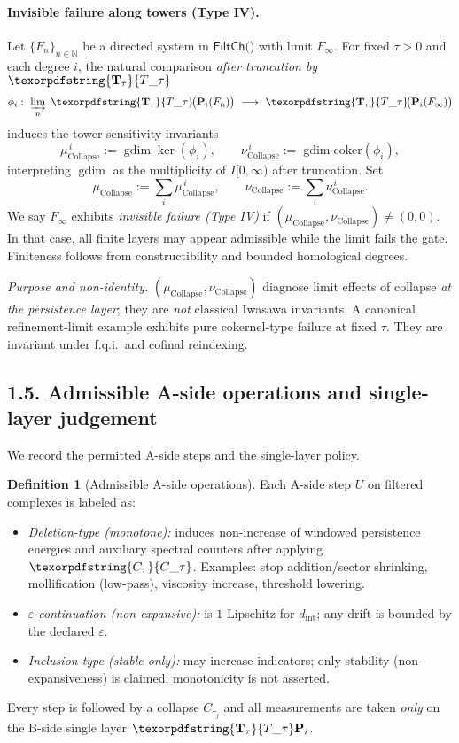 \documentclass[11pt]{article}
\numberwithin{equation}{section}
\theoremstyle{plain}
\theoremstyle{definition}
\theoremstyle{remark}
\DeclareMathOperator{\gdim}{gdim}
\theoremstyle{plain}
\theoremstyle{definition}
\numberwithin{equation}{section}
\theoremstyle{definition}
\newtheorem{definition}[theorem]{Definition}
\DeclareRobustCommand{\FiltCh}[1]{\mathsf{FiltCh}(#1)}
\DeclareRobustCommand{\Ttau}{\texorpdfstring{\ensuremath{\mathbf{T}_{\tau}}}{T\_\tau}}
\DeclareRobustCommand{\Ctau}{\texorpdfstring{\ensuremath{C_{\tau}}}{C\_\tau}}
\numberwithin{equation}{section}
\theoremstyle{plain}
\theoremstyle{definition}
\theoremstyle{remark}
\newcommand{\bbN}{\mathbb{N}}
\newcommand{\intdist}{d_{\mathrm{int}}}
\providecommand{\Cfun}[1]{\mathsf{C}_{#1}}
\providecommand{\Tfun}[1]{\mathbf{T}_{#1}}
\providecommand{\Ctau}{\Cfun{\tau}}
\providecommand{\Ttau}{\Tfun{\tau}}
\providecommand{\intdist}{d_{\mathrm{int}}}  %
\begin{document}
\paragraph{Invisible failure along towers (Type IV).}
Let \(\{F_n\}_{n\in\bbN}\) be a directed system in \(\FiltCh\) with limit \(F_\infty\). For fixed \(\tau>0\) and each degree \(i\), the natural comparison \emph{after truncation by \(\Ttau\)}
\[
\phi_i:\ \varinjlim_{n}\ \Ttau\!\big(\mathbf{P}_i(F_n)\big)\ \longrightarrow\ \Ttau\!\big(\mathbf{P}_i(F_\infty)\big)
\]
induces the tower-sensitivity invariants
\[
\mu_{\mathrm{Collapse}}^{\,i}:=\gdim\ker(\phi_i),\qquad \nu_{\mathrm{Collapse}}^{\,i}:=\gdim\mathrm{coker}(\phi_i),
\]
interpreting \(\gdim\) as the multiplicity of \(I[0,\infty)\) after truncation. Set
\[
\mu_{\mathrm{Collapse}}:=\sum_i \mu_{\mathrm{Collapse}}^{\,i},\qquad \nu_{\mathrm{Collapse}}:=\sum_i \nu_{\mathrm{Collapse}}^{\,i}.
\]
We say \(F_\infty\) exhibits \emph{invisible failure (Type IV)} if \((\mu_{\mathrm{Collapse}},\nu_{\mathrm{Collapse}})\neq (0,0)\). In that case, all finite layers may appear admissible while the limit fails the gate. Finiteness follows from constructibility and bounded homological degrees.

\medskip
\noindent\emph{Purpose and non-identity.} \((\mu_{\mathrm{Collapse}},\nu_{\mathrm{Collapse}})\) diagnose limit effects of collapse \emph{at the persistence layer}; they are \emph{not} classical Iwasawa invariants. A canonical refinement-limit example exhibits pure cokernel-type failure at fixed \(\tau\). They are invariant under f.q.i.\ and cofinal reindexing.

\subsection*{1.5. Admissible A-side operations and single-layer judgement}
We record the permitted A-side steps and the single-layer policy.

\begin{definition}[Admissible A-side operations]\label{def:admissible-ops}
Each A-side step \(U\) on filtered complexes is labeled as:
\begin{itemize}[leftmargin=1.25em]
  \item \emph{Deletion-type (monotone):} induces non-increase of windowed persistence energies and auxiliary spectral counters after applying \(\Ctau\). Examples: stop addition/sector shrinking, mollification (low-pass), viscosity increase, threshold lowering.
  \item \emph{\(\varepsilon\)-continuation (non-expansive):} is \(1\)-Lipschitz for \(\intdist\); any drift is bounded by the declared \(\varepsilon\).
  \item \emph{Inclusion-type (stable only):} may increase indicators; only stability (non-expansiveness) is claimed; monotonicity is not asserted.
\end{itemize}
Every step is followed by a collapse \(C_{\tau_j}\) and all measurements are taken \emph{only} on the B-side single layer \(\Ttau\mathbf{P}_i\).
\end{definition}
\end{document}
